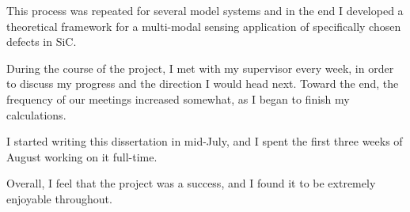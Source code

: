 This process was repeated for several model systems and in the end I developed a theoretical framework for a multi-modal sensing application of specifically chosen defects in SiC. 

During the course of the project, I met with my supervisor every week,
in order to discuss my progress and the direction I would head
next. Toward the end, the frequency of our meetings increased
somewhat, as I began to finish my calculations.

I started writing this dissertation in mid-July, and I spent the first
three weeks of August working on it full-time.

Overall, I feel that the project was a success, and I found it to be
extremely enjoyable throughout.


%
%
%
%
%

